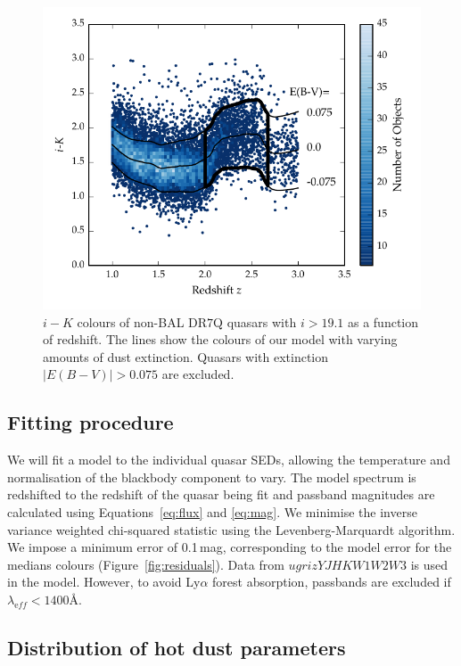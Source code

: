 \begin{figure}[t!]
  \centering
  \includegraphics[width=\columnwidth]{figures/chapter05/ik_versus_z_low_ext.pdf}
  \caption[{$i-K$ colours of non-BAL DR$7$ quasars with $i>19.1$ as a function of redshift.}]{$i-K$ colours of non-BAL DR$7$Q quasars with $i>19.1$ as a function of redshift. The lines show the colours of our model with varying amounts of dust extinction. Quasars with extinction $|E(B-V)|>0.075$ are excluded.}
  \label{fig:ikzplot}
\end{figure}


\subsection{Fitting procedure}

We will fit a model to the individual quasar SEDs, allowing the temperature and normalisation of the blackbody component to vary. 
The model spectrum is redshifted to the redshift of the quasar being fit and passband magnitudes are calculated using Equations~\ref{eq:flux} and \ref{eq:mag}.   
We minimise the inverse variance weighted chi-squared statistic using the Levenberg-Marquardt algorithm. 
We impose a minimum error of 0.1\,mag, corresponding to the model error for the medians colours (Figure~\ref{fig:residuals}). 
Data from $ugrizYJHKW1W2W3$ is used in the model. 
However, to avoid Ly$\alpha$ forest absorption, passbands are excluded if $\lambda_{\mathrm eff} < 1400$\AA.   

\subsection{Distribution of hot dust parameters}

